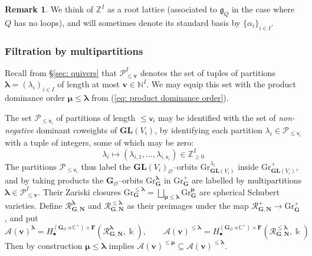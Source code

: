 \documentclass[11pt,reqno]{amsart}
\renewcommand{\mathbf}{\mathbold}
\numberwithin{equation}{section}
\theoremstyle{definition}
\newtheorem{Remark}[equation]{Remark}
\newcommand{\cA}{\mathcal{A}}
\newcommand{\bF}{\mathbf{F}}
\newcommand{\bG}{\mathbf{G}}
\newcommand{\bN}{\mathbf{N}}
\newcommand{\cO}{\mathcal{O}}
\newcommand{\cP}{\mathcal{P}}
\newcommand{\cR}{\mathcal{R}}
\newcommand{\fg}{\mathfrak{g}}
\newcommand{\bv}{\mathbf{v}}
\newcommand{\CC}{\mathbb{C}}
\newcommand{\NN}{\mathbb{N}}
\newcommand{\ZZ}{\mathbb{Z}}
\newcommand{\GL}{\mathbf{GL}}
\newcommand{\Gr}{\mathrm{Gr}}
\newcommand{\kk}{\Bbbk}
\renewcommand{\bv}{\mathbf{v}} %
\newcommand{\sv}{\mathsf{v}}
\newcommand{\quiver}{Q}
\newcommand{\vertexset}{I}
\newcommand{\Partitions}{\cP}
\newcommand{\la}{\lambda}
\newcommand{\bla}{{\boldsymbol{\lambda}}}
\newcommand{\bmu}{{\boldsymbol{\mu}}}
\newcommand{\qzast}{\cA}
\begin{document}
\begin{Remark}
    We think of $\ZZ^\vertexset$ as a root lattice (associated to $\fg_\quiver$ in the case where $\quiver$ has no loops), and will sometimes denote its standard basis by $\{ \alpha_i\}_{i \in \vertexset}$.
\end{Remark}



\subsubsection{Filtration by multipartitions}
\label{sec: filtration}
Recall from \S\ref{sec: quivers} that $\Partitions_{\leq \bv}^\vertexset$ denotes the set of  tuples of partitions $\bla = (\la_i)_{i \in \vertexset}$ of length at most $\bv \in \NN^\vertexset$.  We may equip this set with the product dominance order $\bmu \leq \bla$ from (\ref{eq: product dominance order}).

The set $\Partitions_{\leq \sv_i}$ of partitions of length $\leq \sv_i$ may be identified with the set of \emph{non-negative} dominant coweights of $\GL(V_i)$, by identifying each partition $\lambda_i  \in \Partitions_{\leq \sv_i}$ with a tuple of integers, some of which may be zero:
\begin{equation}
\la_i \mapsto (\la_{i,1},\ldots, \la_{i,\sv_i}) \in \ZZ^\vertexset_{\geq 0}
\end{equation}
The partitions $\Partitions_{\leq \sv_i}$ thus label the $\GL(V_i)_{\cO}$--orbits $\Gr_{\GL(V_i)}^{\la_i} $ inside $\Gr_{\GL(V_i)}^+$, and by taking products the $\bG_\cO$--orbits $\Gr_\bG^{\bla}$ in $\Gr_\bG^+$ are labelled by multipartitions $\bla \in \Partitions_{\leq \bv}^\vertexset$.  Their Zariski closures $\Gr_\bG^{\leq \bla} = \bigsqcup_{\boldsymbol{\mu} \leq \bla} \Gr_\bG^{\boldsymbol{\mu}}$ are spherical Schubert varieties. Define $\cR^{\bla}_{\bG,\bN}$ and $\cR^{\leq \bla}_{\bG,\bN}$ as their preimages under the map $\cR^+_{\bG,\bN} \rightarrow \Gr_\bG^+$, and put
\begin{equation}
\qzast(\bv)^{\bla}  = H_\bullet^{(\bG_\cO \rtimes \CC^\times) \times \bF}( \cR^{\bla}_{\bG,\bN}, \kk), \qquad \qzast(\bv)^{\leq \bla}  =   H_\bullet^{(\bG_\cO \rtimes \CC^\times) \times \bF}( \cR^{\leq \bla}_{\bG,\bN}, \kk)
\end{equation}
Then by construction $\bmu \leq \bla$ implies $\qzast(\bv)^{\leq \bmu} \subseteq \qzast(\bv)^{\leq \bla}$.  
\end{document}
